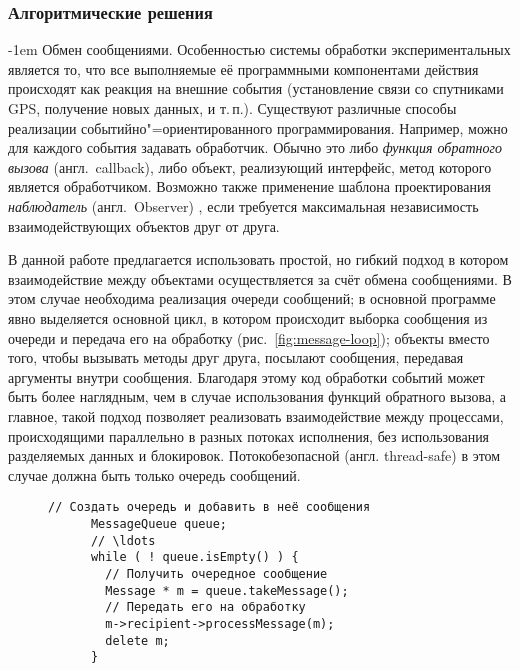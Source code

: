 \documentclass[a4paper, 14pt, titlepage]{extarticle}
\makeatletter
\newcommand{\eng}[1]{\foreignlanguage{english}{#1}}
\newcommand{\term}[1]{\emph{#1}}
\newenvironment{myfigure}[2]%
    {\pushQED{\caption{#1} \label{#2}} %
     \begin{figure}[!htb]\centering } %
    {  \popQED %
     \end{figure}}
\renewcommand{\paragraph}{%
    \@startsection{paragraph}{4}%
    {\parindent}{\z@}{-1em}%
    {\normalfont\normalsize\bfseries}%
  }
\makeatother
\begin{document}
  \subsubsection{Алгоритмические решения}
  \paragraph{Обмен сообщениями.}
  Особенностью системы обработки экспериментальных является то, что все выполняемые её программными
  компонентами действия происходят как реакция на внешние события (установление связи со
  спутниками GPS, получение новых данных, и т.\,п.). Существуют различные способы реализации
  событийно"=ориентированного программирования. Например, можно для каждого события задавать
  обработчик. Обычно это либо \term{функция обратного вызова} (англ.~\eng{callback}), либо объект,
  реализующий интерфейс, метод которого является обработчиком. Возможно также применение шаблона
  проектирования \term{наблюдатель} (англ.~\eng{Observer}) \cite{gamma-patterns}, если требуется
  максимальная независимость взаимодействующих объектов друг от друга.

  В данной работе предлагается использовать простой, но гибкий подход в котором взаимодействие между
  объектами осуществляется за счёт обмена сообщениями. В этом случае необходима реализация очереди
  сообщений; в основной программе явно выделяется основной цикл, в котором происходит выборка
  сообщения из очереди и передача его на обработку (рис.~\ref{fig:message-loop}); объекты вместо
  того, чтобы вызывать методы друг друга, посылают сообщения, передавая аргументы внутри сообщения.
  Благодаря этому код обработки событий может быть более наглядным, чем в случае использования
  функций обратного вызова, а главное, такой подход позволяет реализовать взаимодействие между
  процессами, происходящими параллельно в разных потоках исполнения, без использования разделяемых
  данных и блокировок. Потокобезопасной (англ. \eng{thread-safe}) в этом случае должна быть только
  очередь сообщений.

  \begin{myfigure}{Примерный вид основного цикла}{fig:message-loop}
    \begin{lstlisting}[gobble=6, texcl, xleftmargin=2cm, xrightmargin=2cm]
      // Создать очередь и добавить в неё сообщения
      MessageQueue queue;
      // \ldots
      while ( ! queue.isEmpty() ) {
        // Получить очередное сообщение
        Message * m = queue.takeMessage();
        // Передать его на обработку
        m->recipient->processMessage(m);
        delete m;
      }
    \end{lstlisting}
  \end{myfigure}
\end{document}

